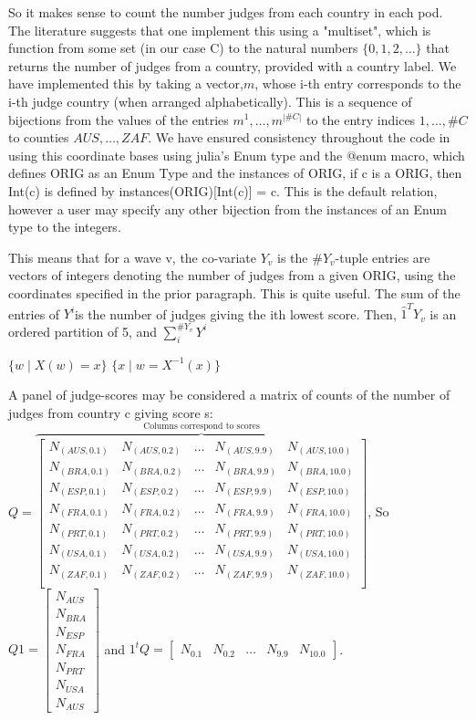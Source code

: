 \documentclass{article}
\begin{document}
So it makes sense to count the number judges from each country in each pod. The literature suggests that one implement this using a "multiset", which is function from some set (in our case C) to the natural numbers $\{0,1,2,\dots\}$ that returns the number of judges from a country, provided with a country label. We have implemented this by taking a vector,$m$, whose i-th entry corresponds to the i-th judge country (when arranged alphabetically). This is a sequence of bijections from the values of the entries $m^1,\dots,m^{|\#C|}$ to the entry indices $1,\dots,\#C$ to counties $AUS,\dots,ZAF$. We have ensured consistency throughout the code in using this coordinate bases using julia's Enum type and the @enum macro, which defines ORIG as an Enum Type and the instances of ORIG, if c is a ORIG, then Int(c) is defined by instances(ORIG)[Int(c)] = c. This is the default relation, however a user may specify any other bijection from the instances of an Enum type to the integers.

This means that for a wave v, the co-variate $Y_v$ is the $\#Y_v$-tuple entries are vectors of integers denoting the number of judges from a given ORIG, using the coordinates specified in the prior paragraph. This is quite useful. The sum of the entries of $Y^i$is the number of judges giving the ith lowest score. Then, $\hat{1}^T Y_v$ is an ordered partition of 5, and $\sum_i^{\#Y_v} Y^i$


$ \{w \mid X(w) = x \} $
$ \{x \mid w = X^{-1}(x) \}$

A panel of judge-scores may be considered a matrix of counts of the number of judges from country c giving score s:
$ Q = \overbrace{\begin{bmatrix}
N_{(AUS,0.1)} & N_{(AUS,0.2)} & \dots & N_{(AUS,9.9)} & N_{(AUS,10.0)} \\
N_{(BRA,0.1)} & N_{(BRA,0.2)} & \dots & N_{(BRA,9.9)} & N_{(BRA,10.0)} \\
N_{(ESP,0.1)} & N_{(ESP,0.2)} & \dots & N_{(ESP,9.9)} & N_{(ESP,10.0)} \\
N_{(FRA,0.1)} & N_{(FRA,0.2)} & \dots & N_{(FRA,9.9)} & N_{(FRA,10.0)} \\
N_{(PRT,0.1)} & N_{(PRT,0.2)} & \dots & N_{(PRT,9.9)} & N_{(PRT,10.0)} \\
N_{(USA,0.1)} & N_{(USA,0.2)} & \dots & N_{(USA,9.9)} & N_{(USA,10.0)} \\
N_{(ZAF,0.1)} & N_{(ZAF,0.2)} & \dots & N_{(ZAF,9.9)} & N_{(ZAF,10.0)} \\
\end{bmatrix}}^{\text{Columns correspond to scores}}$, So $Q 1 = \begin{bmatrix}N_{AUS}\\ N_{BRA}\\N_{ESP}\\ N_{FRA}\\ N_{PRT}\\ N_{USA}\\N_{AUS}  \end{bmatrix}$ 
and $1^t Q = \begin{bmatrix} N_{0.1} & N_{0.2} & \dots & N_{9.9} & N_{10.0}\end{bmatrix}$.
\end{document}
